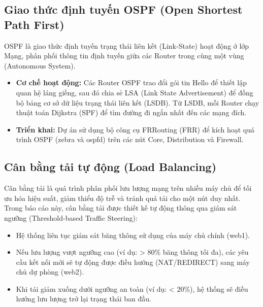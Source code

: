 \subsection{Giao thức định tuyến OSPF (Open Shortest Path First)}
OSPF là giao thức định tuyến trạng thái liên kết (Link-State) hoạt động ở lớp Mạng, phân phối thông tin định tuyến giữa các Router trong cùng một vùng (Autonomous System).
\begin{itemize}
    \item \textbf{Cơ chế hoạt động:} Các Router OSPF trao đổi gói tin Hello để thiết lập quan hệ láng giềng, sau đó chia sẻ LSA (Link State Advertisement) để đồng bộ bảng cơ sở dữ liệu trạng thái liên kết (LSDB). Từ LSDB, mỗi Router chạy thuật toán Dijkstra (SPF) để tìm đường đi ngắn nhất đến các mạng đích.
    \item \textbf{Triển khai:} Dự án sử dụng bộ công cụ FRRouting (FRR) để kích hoạt quá trình OSPF (zebra và ospfd) trên các nút Core, Distribution và Firewall.
\end{itemize}

\subsection{Cân bằng tải tự động (Load Balancing)}
Cân bằng tải là quá trình phân phối lưu lượng mạng trên nhiều máy chủ để tối ưu hóa hiệu suất, giảm thiểu độ trễ và tránh quá tải cho một nút duy nhất.
Trong báo cáo này, cân bằng tải được thiết kế tự động thông qua giám sát ngưỡng (Threshold-based Traffic Steering):
\begin{itemize}
    \item Hệ thống liên tục giám sát băng thông sử dụng của máy chủ chính (web1).
    \item Nếu lưu lượng vượt ngưỡng cao (ví dụ: > 80\% băng thông tối đa), các yêu cầu kết nối mới sẽ tự động được điều hướng (NAT/REDIRECT) sang máy chủ dự phòng (web2).
    \item Khi tải giảm xuống dưới ngưỡng an toàn (ví dụ: < 20\%), hệ thống sẽ điều hướng lưu lượng trở lại trạng thái ban đầu.
\end{itemize}
